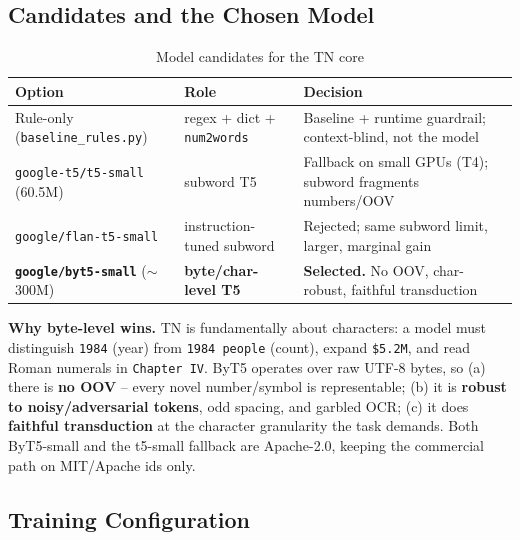 \documentclass[12pt,a4paper]{article}
\begin{document}
\subsection{Candidates and the Chosen Model}

\begin{table}[H]
\centering
\caption{Model candidates for the TN core}
\small
\begin{tabularx}{\linewidth}{@{} l l L @{}}
\toprule
\textbf{Option} & \textbf{Role} & \textbf{Decision} \\
\midrule
Rule-only (\texttt{baseline\_rules.py}) & regex + dict + \texttt{num2words} & Baseline + runtime guardrail; context-blind, not the model \\
\texttt{google-t5/t5-small} (60.5M) & subword T5 & Fallback on small GPUs (T4); subword fragments numbers/OOV \\
\texttt{google/flan-t5-small} & instruction-tuned subword & Rejected; same subword limit, larger, marginal gain \\
\textbf{\texttt{google/byt5-small}} ($\sim$300M) & \textbf{byte/char-level T5} & \textbf{Selected.} No OOV, char-robust, faithful transduction \\
\bottomrule
\end{tabularx}
\end{table}

\textbf{Why byte-level wins.} TN is fundamentally about characters: a model must distinguish \texttt{1984} (year) from \texttt{1984 people} (count), expand \texttt{\$5.2M}, and read Roman numerals in \texttt{Chapter IV}. ByT5 operates over raw UTF-8 bytes, so (a) there is \textbf{no OOV} -- every novel number/symbol is representable; (b) it is \textbf{robust to noisy/adversarial tokens}, odd spacing, and garbled OCR; (c) it does \textbf{faithful transduction} at the character granularity the task demands. Both ByT5-small and the t5-small fallback are Apache-2.0, keeping the commercial path on MIT/Apache ids only.

\subsection{Training Configuration}
\end{document}
